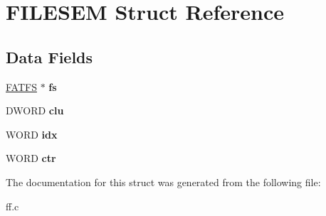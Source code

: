\hypertarget{struct_f_i_l_e_s_e_m}{}\section{F\+I\+L\+E\+S\+EM Struct Reference}
\label{struct_f_i_l_e_s_e_m}
\subsection*{Data Fields}
\begin{DoxyCompactItemize}
\item 
\mbox{\label{struct_f_i_l_e_s_e_m_a0c6a1d2307c6f595a47ceaeaebc80255}} 
\hyperlink{struct_f_a_t_f_s}{F\+A\+T\+FS} $\ast$ {\bfseries fs}
\item 
\mbox{\label{struct_f_i_l_e_s_e_m_a02edc835188d6af7c1b1bc52486a5d78}} 
D\+W\+O\+RD {\bfseries clu}
\item 
\mbox{\label{struct_f_i_l_e_s_e_m_aab093ab4a57ecd03566077ff890e2577}} 
W\+O\+RD {\bfseries idx}
\item 
\mbox{\label{struct_f_i_l_e_s_e_m_a2e5df477fb74015f09d62b0985871f1a}} 
W\+O\+RD {\bfseries ctr}
\end{DoxyCompactItemize}


The documentation for this struct was generated from the following file\+:\begin{DoxyCompactItemize}
\item 
ff.\+c\end{DoxyCompactItemize}
